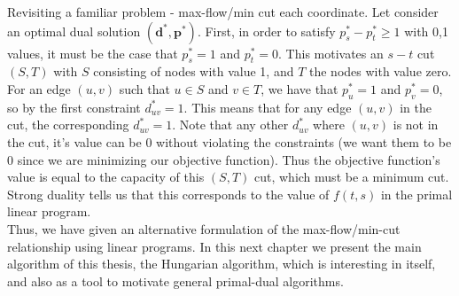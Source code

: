 \documentclass[11pt]{article}
\renewcommand{\'}{^{'}}
\begin{document}
\begin{section}{Revisiting a familiar problem - max-flow/min cut}
	each coordinate. Let consider an optimal dual solution $(\mathbf{d}^{*},\mathbf{p}^{*})$. 
	First, in order to satisfy $p_s^{*} - p_{t}^{*} \geq 1$ with 0,1 values, it must be the case 
	that $p_s^{*} = 1$ and $p_t^{*} = 0$. This motivates an $s-t$ cut $(S,T)$ with $S$ consisting 
	of nodes with value 1, and $T$ the nodes with value zero. For an edge $(u,v)$ such that 
	$u\in S$ and $v\in T$, we have that $p_u^{*} = 1$ and $p_v^{*} = 0$, so by the first constraint 
	$d_{uv}^{*} = 1$. This means that for any edge $(u,v)$ in the cut, the corresponding 
	$d_{uv}^{*} = 1$. Note that any other $d_{uv}^{*}$ where $(u,v)$ is not in the cut, it's value 
	can be 0 without violating the constraints (we want them to be 0 since we are minimizing our 
	objective function). Thus the objective function's value is equal to the capacity of this 
	$(S,T)$ cut, which must be a minimum cut. Strong duality tells us that this corresponds to the 
	value of $f(t,s)$ in the primal linear program.\\
	Thus, we have given an alternative formulation of the max-flow/min-cut relationship using 
	linear programs. In this next chapter we present the main algorithm of this thesis, the 
	Hungarian algorithm, which is interesting in itself, and also as a tool to motivate general 
	primal-dual algorithms.
\end{section}
\end{document}
